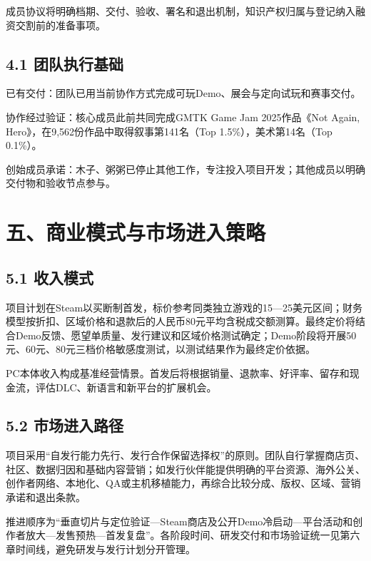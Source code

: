 \documentclass[UTF8,fontset=none,zihao=5,twoside]{ctexart}
\begin{document}
成员协议将明确档期、交付、验收、署名和退出机制，知识产权归属与登记纳入融资交割前的准备事项。

\subsection{4.1 团队执行基础}\label{41-ux56e2ux961fux6267ux884cux57faux7840}

已有交付：团队已用当前协作方式完成可玩Demo、展会与定向试玩和赛事交付。

协作经过验证：核心成员此前共同完成GMTK Game Jam 2025作品《Not Again, Hero》，在9,562份作品中取得叙事第141名（Top 1.5\%），美术第14名（Top 0.1\%）。

创始成员承诺：木子、粥粥已停止其他工作，专注投入项目开发；其他成员以明确交付物和验收节点参与。

\section{五、商业模式与市场进入策略}\label{ux4e94ux5546ux4e1aux6a21ux5f0fux4e0eux5e02ux573aux8fdbux5165ux7b56ux7565}

\subsection{5.1 收入模式}\label{51-ux6536ux5165ux6a21ux5f0f}

项目计划在Steam以买断制首发，标价参考同类独立游戏的15---25美元区间；财务模型按折扣、区域价格和退款后的人民币80元平均含税成交额测算。最终定价将结合Demo反馈、愿望单质量、发行建议和区域价格测试确定；Demo阶段将开展50元、60元、80元三档价格敏感度测试，以测试结果作为最终定价依据。

PC本体收入构成基准经营情景。首发后将根据销量、退款率、好评率、留存和现金流，评估DLC、新语言和新平台的扩展机会。

\subsection{5.2 市场进入路径}\label{52-ux5e02ux573aux8fdbux5165ux8defux5f84}

项目采用``自发行能力先行、发行合作保留选择权''的原则。团队自行掌握商店页、社区、数据归因和基础内容营销；如发行伙伴能提供明确的平台资源、海外公关、创作者网络、本地化、QA或主机移植能力，再综合比较分成、版权、区域、营销承诺和退出条款。

推进顺序为``垂直切片与定位验证---Steam商店及公开Demo冷启动---平台活动和创作者放大---发售预热---首发复盘''。各阶段时间、研发交付和市场验证统一见第六章时间线，避免研发与发行计划分开管理。
\end{document}

